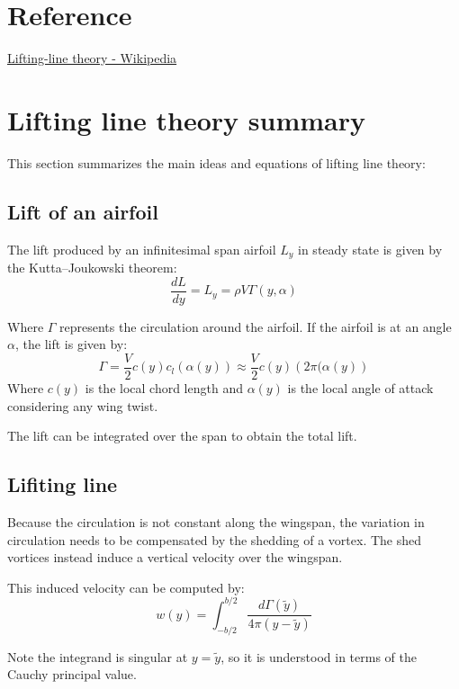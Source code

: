\section{Reference}
\href{https://en.wikipedia.org/wiki/Lifting-line_theory}{Lifting-line theory - Wikipedia}

\section{Lifting line theory summary}
This section summarizes the main ideas and equations of lifting line theory:

\subsection{Lift of an airfoil}
The lift produced by an infinitesimal span airfoil $L_y$ in steady state is given by the Kutta–Joukowski theorem: 
\begin{equation}
    \frac{dL}{dy} = L_y = \rho V \Gamma(y, \alpha)
\end{equation}

Where $\Gamma$ represents the circulation around the airfoil. If the airfoil is at an angle $\alpha$, the lift is given by:
\begin{equation}
    \Gamma = \frac{V}{2} c(y) c_l(\alpha(y)) \approx \frac{V}{2} c(y) \left(2 \pi (\alpha(y)\right)
\end{equation}
Where $c(y)$ is the local chord length and $\alpha(y)$ is the local angle of attack considering any wing twist.

The lift can be integrated over the span to obtain the total lift.

\subsection{Lifiting line}
Because the circulation is not constant along the wingspan, the variation in circulation needs to be compensated by the shedding of a vortex. The shed vortices instead induce a vertical velocity over the wingspan.

This induced velocity can be computed by:
\begin{equation}
    w(y) = \int_{-b/2}^{b/2} \frac{d\Gamma(\tilde{y})}{4\pi\left(y - \tilde{y}\right)}
\end{equation}

Note the integrand is singular at $y = \tilde{y}$, so it is understood in terms of the Cauchy principal value.

